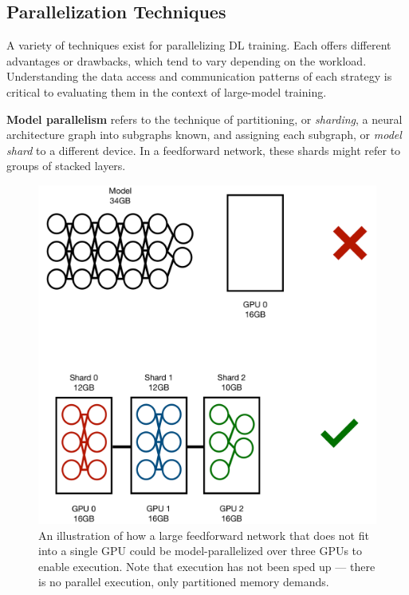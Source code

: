 \subsection{Parallelization Techniques}\label{sec:parallelization}
A variety of techniques exist for parallelizing DL training. Each offers different advantages or drawbacks, which tend to vary depending on the workload. Understanding the data access and communication patterns of each strategy is critical to evaluating them in the context of large-model training.

\textbf{Model parallelism} refers to the technique of partitioning, or \textit{sharding}, a neural architecture graph into subgraphs known, and assigning each subgraph, or \textit{model shard} to a different device. In a feedforward network, these shards might refer to groups of stacked layers.

\begin{figure}[th!]
\centering
	\includegraphics[keepaspectratio=true, width=0.9\linewidth]{images/model_parallelism_basic}
	\caption{An illustration of how a large feedforward network that does not fit into a single GPU could be model-parallelized over three GPUs to enable execution. Note that execution has not been sped up --- there is no parallel execution, only partitioned memory demands.}
	\label{fig:model_parallel_feedforward}
\end{figure}


